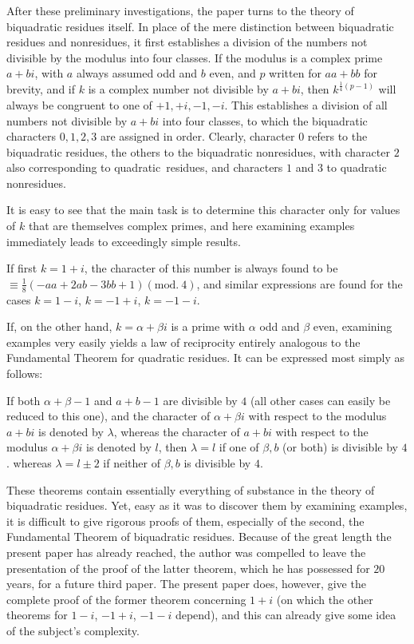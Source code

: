 After these preliminary investigations, the paper turns to the theory of biquadratic residues itself. In place of the mere distinction between biquadratic residues and nonresidues, it first establishes a division of the numbers not divisible by the modulus into four classes. If the modulus is a complex prime $a+bi$, with $a$ always assumed odd and $b$ even, and $p$ written for $aa+bb$ for brevity, and if $k$ is a complex number not divisible by $a+bi$, then $k^{\frac14(p-1)}$ will always be
congruent to one of $+1,+i,-1,-i$. This establishes a division of all numbers not divisible by $a+bi$ into four classes, to which the biquadratic characters $0,1,2,3$ are assigned in order. Clearly, character $0$ refers to the biquadratic residues, the others to the biquadratic nonresidues, with character $2$ also corresponding to quadratic\textperiodcentered\ residues, and characters $1$ and $3$ to quadratic nonresidues.

It is easy to see that the main task is to determine this character only for values of $k$ that are themselves complex primes, and here examining examples immediately leads to exceedingly simple results.

If first $k=1+i$, the character of this number is always found to be $\equiv\frac18(-aa+2ab-3bb+1)(\mathrm{mod.}\ 4)$, and similar expressions are found for the cases $k=1-i$, $k=-1+i$, $k=-1-i$.

If, on the other hand, $k=\alpha+\beta i$ is a prime with $\alpha$ odd and $\beta$ even, examining examples very easily yields a law of reciprocity entirely analogous to the Fundamental Theorem for quadratic residues. It can be expressed most simply as follows:

If both $\alpha+\beta-1$ and $a+b-1$ are divisible by $4$ (all other cases can easily be reduced to this one), and the character of $\alpha+\beta i$ with respect to the modulus $a+bi$ is denoted by $\lambda$, whereas the character of $a+bi$ with respect to the modulus $\alpha+\beta i$ is denoted by $l$, then $\lambda=l$ if one of $\beta,b$ (or both) is divisible by $4$. whereas $\lambda=l\pm2$ if neither of $\beta,b$ is divisible by $4$.

These theorems contain essentially everything of substance in the theory of biquadratic residues. Yet, easy as it was to discover them by examining examples, it is difficult to give rigorous proofs of them, especially of the second, the Fundamental Theorem of biquadratic residues. Because of the great length the present paper has already reached, the author was compelled to leave the presentation of the proof of the latter theorem, which he has possessed for $20$ years, for a future third paper. The present paper does, however, give the complete proof of the former theorem concerning $1+i$ (on which the
other theorems for $1-i$, $-1+i$, $-1-i$ depend), and this can already give some idea of the subject's complexity.

